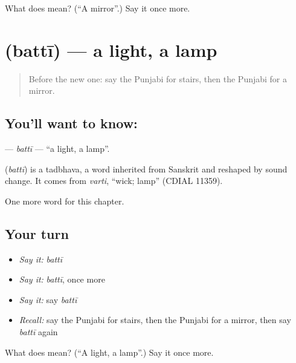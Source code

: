 \begin{tcolorbox}[breakable,colback=teal!4,colframe=teal!35!black,title={Before you move on}]
What does  mean? (\textquotedblleft{}A mirror\textquotedblright{}.) Say it once more.
\end{tcolorbox}
\section[\texorpdfstring{\pa{ਬੱਤੀ} (battī)}{ਬੱਤੀ (battī)}]{ (battī) — a light, a lamp}

\label{lesson:PA-C69-batti}



\begin{quote}
Before the new one: say the Punjabi for stairs, then the Punjabi for a mirror.
\end{quote}

\subsection*{You'll want to know: }
\textbf{} — \emph{battī} — \textquotedblleft{}a light, a lamp\textquotedblright{}.

\begin{cousinweb}
\textbf{} (\emph{battī}) is a tadbhava, a word inherited from Sanskrit and reshaped by sound change. It comes from \emph{varti}, \textquotedblleft{}wick; lamp\textquotedblright{} (CDIAL 11359).
\end{cousinweb}

\begin{grammarlens}[title={What you've built}]
One more word for this chapter.
\end{grammarlens}

\subsection*{Your turn}
\begin{itemize}
\raggedright
  \item \emph{Say it:} \emph{battī}
  \item \emph{Say it:} \emph{battī}, once more
  \item \emph{Say it:} say \emph{battī}
  \item \emph{Recall:} say the Punjabi for stairs, then the Punjabi for a mirror, then say \emph{battī} again
\end{itemize}

\begin{tcolorbox}[breakable,colback=teal!4,colframe=teal!35!black,title={Before you move on}]
What does  mean? (\textquotedblleft{}A light, a lamp\textquotedblright{}.) Say it once more.
\end{tcolorbox}
